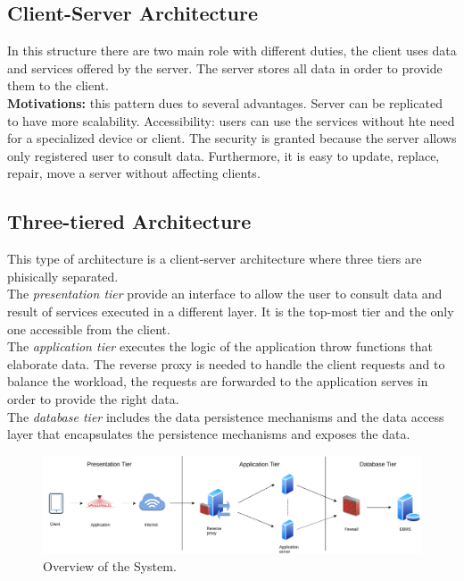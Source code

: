 \documentclass{report}
\begin{document}
\subsection{Client-Server Architecture}
In this structure there are two main role with different duties, the client uses data and services offered by the server.
The server stores all data in order to provide them to the client.\\
\textbf{Motivations:} this pattern dues to several advantages. Server can be replicated to have more scalability. 
Accessibility: users can use the services without hte need for a specialized device or client.
The security is granted because the server allows only registered user to consult data.
Furthermore, it is easy to update, replace, repair, move a server without affecting clients.
\subsection{Three-tiered Architecture}
This type of architecture is a client-server architecture where three tiers are phisically separated.\\
The \textit{presentation tier} provide an interface to allow the user to consult data and result of services executed in a different layer. 
It is the top-most tier and the only one accessible from the client.\\
The \textit{application tier} executes the logic of the application throw functions that elaborate data. 
The reverse proxy is needed to handle the client requests and to balance the workload, the requests are forwarded to 
the application serves in order to provide the right data.\\
The \textit{database tier} includes the data persistence mechanisms and the data access layer that encapsulates 
the persistence mechanisms and exposes the data.
\begin{figure}[!ht]
	\begin{center}
	\includegraphics[width=\textwidth]{img/TiersArchitecture.png}
	\end{center}
	\caption{Overview of the System.}
\end{figure}
\end{document}
